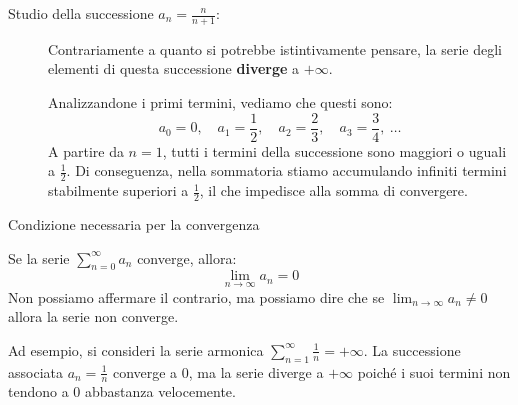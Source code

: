 \documentclass[12pt]{report}
\begin{document}
	\begin{description}
		
		\item[Studio della successione $a_n = \frac{n}{n+1}$:] 
		Contrariamente a quanto si potrebbe istintivamente pensare, la serie degli elementi di questa successione \textbf{diverge} a $+\infty$. 
		
		Analizzandone i primi termini, vediamo che questi sono:
		\[
		a_0 = 0, \quad a_1 = \frac{1}{2}, \quad a_2 = \frac{2}{3}, \quad a_3 = \frac{3}{4}, \ \dots
		\]
		A partire da $n = 1$, tutti i termini della successione sono maggiori o uguali a $\frac{1}{2}$. Di conseguenza, nella sommatoria stiamo accumulando infiniti termini stabilmente superiori a $\frac{1}{2}$, il che impedisce alla somma di convergere.
		
	\end{description}
	
	\begin{proposizione}{Condizione necessaria per la convergenza}{}
		
		Se la serie $\sum_{n=0}^{\infty} a_n$ converge, allora:
		\[
		\lim_{n\to\infty} a_n = 0
		\]
		Non possiamo affermare il contrario, ma possiamo dire che se $\lim_{n\to\infty} a_n \neq 0$ allora la serie non converge.
		
	\end{proposizione}
	
	\begin{osservazione}{}{}
		
		Ad esempio, si consideri la serie armonica $\sum_{n=1}^{\infty} \frac{1}{n} = +\infty$. La successione associata $a_n = \frac{1}{n}$ converge a $0$, ma la serie diverge a $+\infty$ poiché i suoi termini non tendono a $0$ abbastanza velocemente.
		
	\end{osservazione}
	
\end{document}
